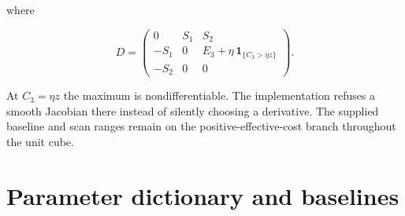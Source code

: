\documentclass[
  11pt,
  letterpaper,
]{article}
\begin{document}
where

\[
D=\begin{pmatrix}
0&S_1&S_2\\
-S_1&0&E_3+\eta\,\mathbf{1}_{\{C_3>\eta z\}}\\
-S_2&0&0
\end{pmatrix}.
\]

At \(C_3=\eta z\) the maximum is nondifferentiable. The implementation
refuses a smooth Jacobian there instead of silently choosing a
derivative. The supplied baseline and scan ranges remain on the
positive-effective-cost branch throughout the unit cube.

\clearpage
\section{Parameter dictionary and
baselines}\label{parameter-dictionary-and-baselines}
\end{document}
